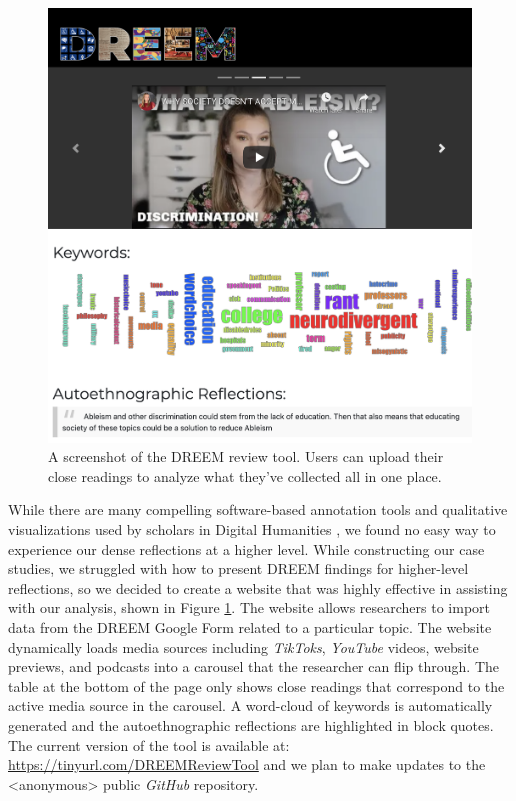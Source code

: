 \begin{figure}
    \centering
    \includegraphics[width=\linewidth]{Figures/Reviewer.png}
    \caption{A screenshot of the DREEM review tool. Users can upload their close readings to analyze what they've collected all in one place.}
    \label{fig:reviewer}
\end{figure}
While there are many compelling software-based annotation tools and qualitative visualizations used by scholars in Digital Humanities \cite{janickeCloseDistantReading2015}, we found no easy way to experience our dense reflections at a higher level. While constructing our case studies, we struggled with how to present DREEM findings for higher-level reflections, so we decided to create a website that was highly effective in assisting with our analysis, shown in Figure \ref{fig:reviewer}. The website allows researchers to import data from the DREEM Google Form related to a particular topic. The website dynamically loads media sources including \textit{TikToks}, \textit{YouTube} videos, website previews, and podcasts into a carousel that the researcher can flip through. The table at the bottom of the page only shows close readings that correspond to the active media source in the carousel. A word-cloud of keywords is automatically generated and the autoethnographic reflections are highlighted in block quotes. The current version of the tool is available at: \url{https://tinyurl.com/DREEMReviewTool} and we plan to make updates to the <anonymous> public \textit{GitHub} repository. 

